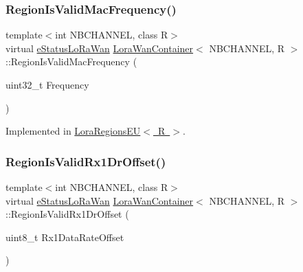 \mbox{\label{class_lora_wan_container_a14be092c3440b0bbfe9683f14c648eb2}} 
\subsubsection{\texorpdfstring{Region\+Is\+Valid\+Mac\+Frequency()}{RegionIsValidMacFrequency()}}
{\footnotesize\ttfamily template$<$int N\+B\+C\+H\+A\+N\+N\+EL, class R$>$ \\
virtual \mbox{\hyperlink{_define_8h_a1cea710adbbf5b02bced8f79cd82f7b9}{e\+Status\+Lo\+Ra\+Wan}} \mbox{\hyperlink{class_lora_wan_container}{Lora\+Wan\+Container}}$<$ N\+B\+C\+H\+A\+N\+N\+EL, R $>$\+::Region\+Is\+Valid\+Mac\+Frequency (\begin{DoxyParamCaption}\item[{uint32\+\_\+t}]{Frequency }\end{DoxyParamCaption})\hspace{0.3cm}{\ttfamily [pure virtual]}}



Implemented in \mbox{\hyperlink{class_lora_regions_e_u_a192e8af5bcab83f1f7ff48b5d130206e}{Lora\+Regions\+E\+U$<$ R $>$}}.

\mbox{\label{class_lora_wan_container_ac5d3abcc857b6b1f0535e12915dd2bfb}} 
\subsubsection{\texorpdfstring{Region\+Is\+Valid\+Rx1\+Dr\+Offset()}{RegionIsValidRx1DrOffset()}}
{\footnotesize\ttfamily template$<$int N\+B\+C\+H\+A\+N\+N\+EL, class R$>$ \\
virtual \mbox{\hyperlink{_define_8h_a1cea710adbbf5b02bced8f79cd82f7b9}{e\+Status\+Lo\+Ra\+Wan}} \mbox{\hyperlink{class_lora_wan_container}{Lora\+Wan\+Container}}$<$ N\+B\+C\+H\+A\+N\+N\+EL, R $>$\+::Region\+Is\+Valid\+Rx1\+Dr\+Offset (\begin{DoxyParamCaption}\item[{uint8\+\_\+t}]{Rx1\+Data\+Rate\+Offset }\end{DoxyParamCaption})\hspace{0.3cm}{\ttfamily [pure virtual]}}



